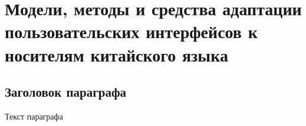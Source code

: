 \chapter{Модели, методы и средства адаптации пользовательских интерфейсов к носителям китайского языка}
\label{chapter_chinese_interfaces}


\section{Заголовок параграфа}
Текст параграфа

%